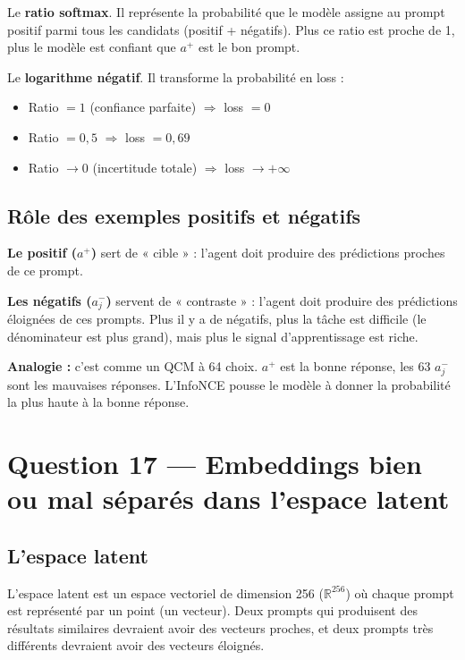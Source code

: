 \documentclass[11pt,a4paper]{article}
\begin{document}
\begin{description}[style=nextline, leftmargin=2cm]
    \item[$\frac{e^{\text{sim}(p, a^+)/\tau}}{\text{dénominateur}}$] Le \textbf{ratio softmax}. Il représente la probabilité que le modèle assigne au prompt positif parmi tous les candidats (positif + négatifs). Plus ce ratio est proche de 1, plus le modèle est confiant que $a^+$ est le bon prompt.
    
    \item[$-\log(\cdot)$] Le \textbf{logarithme négatif}. Il transforme la probabilité en loss :
    \begin{itemize}
        \item Ratio $= 1$ (confiance parfaite) $\Rightarrow$ loss $= 0$
        \item Ratio $= 0{,}5$ $\Rightarrow$ loss $= 0{,}69$
        \item Ratio $\to 0$ (incertitude totale) $\Rightarrow$ loss $\to +\infty$
    \end{itemize}
\end{description}

\subsection{Rôle des exemples positifs et négatifs}

\textbf{Le positif ($a^+$)} sert de « cible » : l'agent doit produire des prédictions proches de ce prompt.

\textbf{Les négatifs ($a_j^-$)} servent de « contraste » : l'agent doit produire des prédictions éloignées de ces prompts. Plus il y a de négatifs, plus la tâche est difficile (le dénominateur est plus grand), mais plus le signal d'apprentissage est riche.

\textbf{Analogie :} c'est comme un QCM à 64 choix. $a^+$ est la bonne réponse, les 63 $a_j^-$ sont les mauvaises réponses. L'InfoNCE pousse le modèle à donner la probabilité la plus haute à la bonne réponse.

\section{Question 17 — Embeddings bien ou mal séparés dans l'espace latent}

\subsection{L'espace latent}

L'espace latent est un espace vectoriel de dimension 256 ($\mathbb{R}^{256}$) où chaque prompt est représenté par un point (un vecteur). Deux prompts qui produisent des résultats similaires devraient avoir des vecteurs proches, et deux prompts très différents devraient avoir des vecteurs éloignés.
\end{document}
